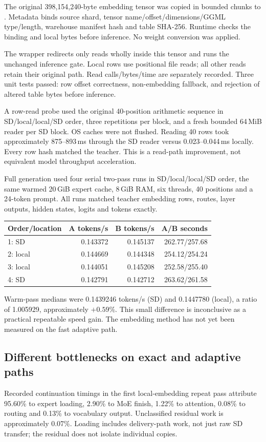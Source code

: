 The original 398,154,240-byte embedding tensor was copied in bounded chunks
to .
Metadata binds source shard, tensor name/offset/dimensions/GGML type/length,
warehouse manifest hash and table SHA-256. Runtime checks the binding and
local bytes before inference. No weight conversion was applied.

The wrapper redirects only reads wholly inside this tensor and runs the
unchanged inference gate. Local rows use positional file reads; all other
reads retain their original path. Read calls/bytes/time are separately
recorded. Three unit tests passed: row offset correctness, non-embedding
fallback, and rejection of altered table bytes before inference.

A row-read probe used the original 40-position arithmetic sequence in
SD/local/local/SD order, three repetitions per block, and a fresh bounded
64\,MiB reader per SD block. OS caches were not flushed. Reading 40 rows
took approximately 875--893\,ms through the SD reader versus
0.023--0.044\,ms locally. Every row hash matched the teacher. This is a
read-path improvement, not equivalent model throughput acceleration.

Full generation used four serial two-pass runs in SD/local/local/SD order,
the same warmed 20\,GiB expert cache, 8\,GiB RAM, six threads, 40 positions
and a 24-token prompt. All runs matched teacher embedding rows, routes,
layer outputs, hidden states, logits and tokens exactly.
\begin{center}
\begin{tabular}{lrrr}
\toprule
Order/location & A tokens/s & B tokens/s & A/B seconds \\
\midrule
1: SD & 0.143372 & 0.145137 & 262.77/257.68 \\
2: local & 0.144669 & 0.144348 & 254.12/254.24 \\
3: local & 0.144051 & 0.145208 & 252.58/255.40 \\
4: SD & 0.142791 & 0.142712 & 263.62/261.58 \\
\bottomrule
\end{tabular}
\end{center}
Warm-pass medians were 0.1439246 tokens/s (SD) and 0.1447780 (local), a
ratio of 1.005929, approximately $+0.59\%$. This small difference is
inconclusive as a practical repeatable speed gain. The embedding method
has not yet been measured on the fast adaptive path.

\subsection{Different bottlenecks on exact and adaptive paths}
Recorded continuation timings in the first local-embedding repeat pass
attribute 95.60\% to expert loading, 2.90\% to MoE finish, 1.22\% to
attention, 0.08\% to routing and 0.13\% to vocabulary output. Unclassified
residual work is approximately 0.07\%. Loading includes delivery-path work,
not just raw SD transfer; the residual does not isolate individual copies.

